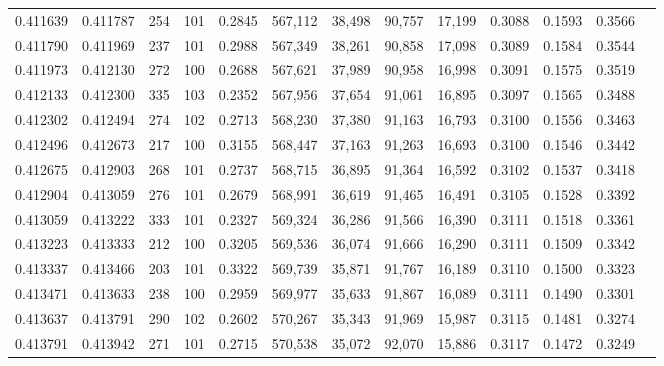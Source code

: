 \begin{tabular}{rrrrrrrrrrrrr}
0.411639 & 0.411787 &   254 & 101 &                                     0.2845 & 567,112 &  38,498 &  90,757 &  17,199 & 0.3088 & 0.1593 & 0.3566 \\
0.411790 & 0.411969 &   237 & 101 &                                     0.2988 & 567,349 &  38,261 &  90,858 &  17,098 & 0.3089 & 0.1584 & 0.3544 \\
0.411973 & 0.412130 &   272 & 100 &                                     0.2688 & 567,621 &  37,989 &  90,958 &  16,998 & 0.3091 & 0.1575 & 0.3519 \\
0.412133 & 0.412300 &   335 & 103 &                                     0.2352 & 567,956 &  37,654 &  91,061 &  16,895 & 0.3097 & 0.1565 & 0.3488 \\
0.412302 & 0.412494 &   274 & 102 &                                     0.2713 & 568,230 &  37,380 &  91,163 &  16,793 & 0.3100 & 0.1556 & 0.3463 \\
0.412496 & 0.412673 &   217 & 100 &                                     0.3155 & 568,447 &  37,163 &  91,263 &  16,693 & 0.3100 & 0.1546 & 0.3442 \\
0.412675 & 0.412903 &   268 & 101 &                                     0.2737 & 568,715 &  36,895 &  91,364 &  16,592 & 0.3102 & 0.1537 & 0.3418 \\
0.412904 & 0.413059 &   276 & 101 &                                     0.2679 & 568,991 &  36,619 &  91,465 &  16,491 & 0.3105 & 0.1528 & 0.3392 \\
0.413059 & 0.413222 &   333 & 101 &                                     0.2327 & 569,324 &  36,286 &  91,566 &  16,390 & 0.3111 & 0.1518 & 0.3361 \\
0.413223 & 0.413333 &   212 & 100 &                                     0.3205 & 569,536 &  36,074 &  91,666 &  16,290 & 0.3111 & 0.1509 & 0.3342 \\
0.413337 & 0.413466 &   203 & 101 &                                     0.3322 & 569,739 &  35,871 &  91,767 &  16,189 & 0.3110 & 0.1500 & 0.3323 \\
0.413471 & 0.413633 &   238 & 100 &                                     0.2959 & 569,977 &  35,633 &  91,867 &  16,089 & 0.3111 & 0.1490 & 0.3301 \\
0.413637 & 0.413791 &   290 & 102 &                                     0.2602 & 570,267 &  35,343 &  91,969 &  15,987 & 0.3115 & 0.1481 & 0.3274 \\
0.413791 & 0.413942 &   271 & 101 &                                     0.2715 & 570,538 &  35,072 &  92,070 &  15,886 & 0.3117 & 0.1472 & 0.3249 \\

\end{tabular}
